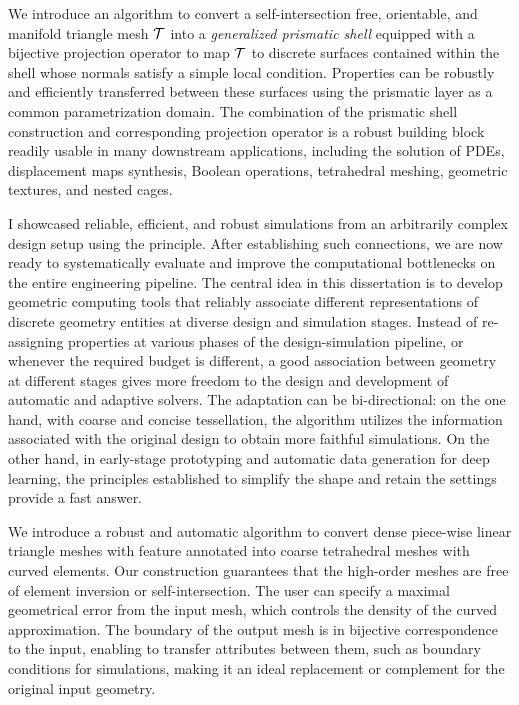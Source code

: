 We introduce an algorithm to convert a self-intersection free, orientable, and manifold triangle mesh $\mathcal{T}$ into a \emph{generalized prismatic shell} equipped with a bijective projection operator to map $\mathcal{T}$ to  discrete surfaces contained within the shell whose normals satisfy a simple local condition. Properties can be robustly and efficiently transferred between these surfaces using the prismatic layer as a common parametrization domain. 
The combination of the prismatic shell construction and corresponding projection operator is a robust building block readily usable in many downstream applications, including the solution of PDEs, displacement maps synthesis, Boolean operations, tetrahedral meshing, geometric textures, and nested cages.

I showcased reliable, efficient, and robust simulations from an arbitrarily complex design setup using the principle. After establishing such connections, we are now ready to systematically evaluate and improve the computational bottlenecks on the entire engineering pipeline.
The central idea in this dissertation is to develop geometric computing tools that reliably associate different representations of discrete geometry entities at diverse design and simulation stages. Instead of re-assigning properties at various phases of the design-simulation pipeline, or whenever the required budget is different, a good association between geometry at different stages gives more freedom to the design and development of automatic and adaptive solvers. The adaptation can be bi-directional: on the one hand, with coarse and concise tessellation, the algorithm utilizes the information associated with the original design to obtain more faithful simulations. On the other hand, in early-stage prototyping and automatic data generation for deep learning, the principles established to simplify the shape and retain the settings provide a fast answer. 

We introduce a robust and automatic algorithm to convert dense piece-wise linear triangle meshes with feature annotated into coarse tetrahedral meshes with curved elements. 
Our construction guarantees that the high-order meshes are free of element inversion or self-intersection. 
The user can specify a maximal geometrical error from the input mesh, which  controls the density of the curved approximation. The boundary of the output mesh is in bijective correspondence to the input, enabling to transfer attributes between them, such as boundary conditions for simulations, making it an ideal replacement or complement for the original input geometry. 

